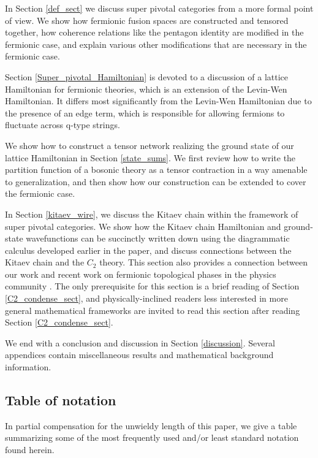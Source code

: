 In Section \ref{def_sect} we discuss super pivotal categories from a more formal point of view. 
We show how fermionic fusion spaces are constructed and tensored together, how 
coherence relations like the pentagon identity are modified in the fermionic case, 
and 
explain various other modifications that are necessary in the fermionic case.

Section \ref{Super_pivotal_Hamiltonian} is devoted to a discussion of a lattice Hamiltonian for fermionic theories, which is an extension of the Levin-Wen Hamiltonian. 
It differs most significantly from the Levin-Wen Hamiltonian due to the presence of an edge term, which 
is responsible for allowing fermions to fluctuate across q-type strings.

We show how to construct a tensor network realizing the ground state of our lattice Hamiltonian 
in Section \ref{state_sums}. We first review how to write the partition function of a bosonic theory 
as a tensor contraction in a way amenable to generalization, and then show how our construction 
can be extended to cover the fermionic case. 

In Section \ref{kitaev_wire}, we discuss the Kitaev chain within the framework of super pivotal 
categories. 
We show how the Kitaev chain Hamiltonian and ground-state wavefunctions can be 
succinctly written down using the diagrammatic calculus developed earlier in the paper, and 
discuss connections between the Kitaev chain and the $C_2$ theory. 
This section also provides a connection between our work 
and recent work on fermionic topological phases in the physics community \cite{ware2016,tarantino2016,turzillo2016}. 
The only prerequisite for this section is a brief reading of Section \ref{C2_condense_sect}, and physically-inclined readers less interested in more general mathematical frameworks
are invited to read this section after reading Section \ref{C2_condense_sect}. 

We end with a conclusion and discussion in Section \ref{discussion}. 
Several appendices contain miscellaneous results and mathematical background information. 


\subsection{Table of notation}

In partial compensation for the unwieldy length of this paper, we give a table summarizing some of the 
most frequently used and/or least standard notation found herein.

